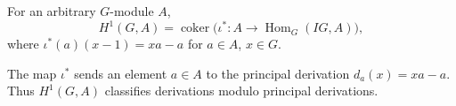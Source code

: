For an arbitrary $G$-module $A$,
$$H^1(G, A) = \operatorname{coker}\bigl(\iota^* : A \to \operatorname{Hom}_G(IG, A)\bigr),$$
where $\iota^*(a)(x - 1) = xa - a$ for $a \in A$, $x \in G$.

The map $\iota^*$ sends an element $a \in A$ to the principal derivation $d_a(x) = xa - a$. Thus $H^1(G, A)$ classifies derivations modulo principal derivations.
